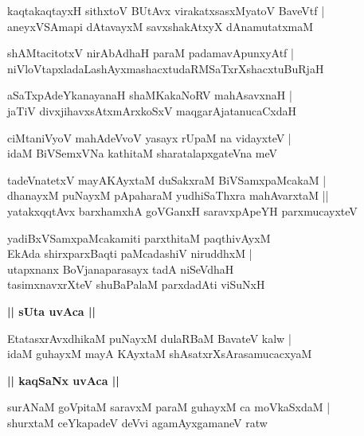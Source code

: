 \documentclass[twoside,12pt,openright]{book}
\newcounter{shloka}[chapter]
\def\uvaca#1{\centerline{{\large\textbf{#1}}}}
\begin{document}
\begin{shloka}%
kaqtakaqtayxH sithxtoV BUtAvx virakatxsasxMyatoV BaveVtf |\\
aneyxVSAmapi dAtavayxM savxshakAtxyX dAnamutatxmaM 
\end{shloka}

\begin{shloka}%
shAMtacitotxV nirAbAdhaH paraM padamavApunxyAtf |\\
niVloVtapxladaLashAyxmashacxtudaRMSaTxrXshacxtuBuRjaH
\end{shloka}

\begin{shloka}%
aSaTxpAdeYkanayanaH shaMKakaNoRV mahAsavxnaH |\\
jaTiV divxjihavxsAtxmArxkoSxV maqgarAjatanucaCxdaH 
\end{shloka}

\begin{shloka}%
ciMtaniVyoV mahAdeVvoV yasayx rUpaM na vidayxteV |\\
idaM BiVSemxVNa kathitaM sharatalapxgateVna meV 
\end{shloka}

\begin{shloka}%
tadeVnatetxV mayAKAyxtaM duSakxraM BiVSamxpaMcakaM |\\
dhanayxM puNayxM pApaharaM yudhiSaThxra mahAvarxtaM ||\\
yatakxqqtAvx barxhamxhA goVGanxH saravxpApeYH parxmucayxteV 
\end{shloka}

\begin{shloka}%
yadiBxVSamxpaMcakamiti parxthitaM paqthivAyxM \\
EkAda shirxparxBaqti paMcadashiV niruddhxM |\\
utapxnanx BoVjanaparasayx tadA niSeVdhaH \\
tasimxnavxrXteV shuBaPalaM parxdadAti viSuNxH 
\end{shloka}

\uvaca{|| sUta uvAca ||}

\begin{shloka}%
EtatasxrAvxdhikaM puNayxM dulaRBaM BavateV kalw |\\
idaM guhayxM mayA KAyxtaM shAsatxrXsArasamucacxyaM 
\end{shloka}

\uvaca{|| kaqSaNx uvAca ||}

\begin{shloka}%
surANaM goVpitaM saravxM paraM guhayxM ca moVkaSxdaM |\\
shurxtaM ceYkapadeV deVvi agamAyxgamaneV ratw 
\end{shloka}
\end{document}
